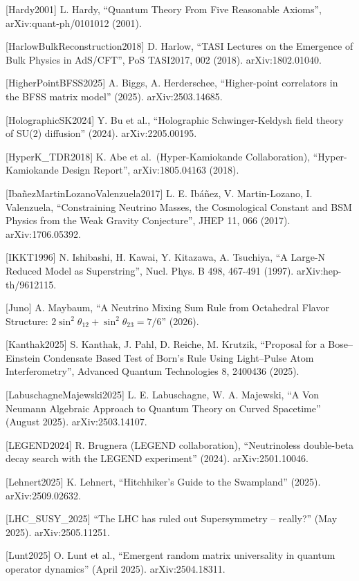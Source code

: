 \documentclass[
]{article}
\begin{document}
{[}Hardy2001{]} L. Hardy, ``Quantum Theory From Five Reasonable
Axioms'', arXiv:quant-ph/0101012 (2001).

{[}HarlowBulkReconstruction2018{]} D. Harlow, ``TASI Lectures on the
Emergence of Bulk Physics in AdS/CFT'', PoS TASI2017, 002 (2018).
arXiv:1802.01040.

{[}HigherPointBFSS2025{]} A. Biggs, A. Herderschee, ``Higher-point
correlators in the BFSS matrix model'' (2025). arXiv:2503.14685.

{[}HolographicSK2024{]} Y. Bu et al., ``Holographic Schwinger-Keldysh
field theory of SU(2) diffusion'' (2024). arXiv:2205.00195.

{[}HyperK\_TDR2018{]} K. Abe et al.~(Hyper-Kamiokande Collaboration),
``Hyper-Kamiokande Design Report'', arXiv:1805.04163 (2018).

{[}IbañezMartinLozanoValenzuela2017{]} L. E. Ibáñez, V. Martin-Lozano,
I. Valenzuela, ``Constraining Neutrino Masses, the Cosmological Constant
and BSM Physics from the Weak Gravity Conjecture'', JHEP 11, 066 (2017).
arXiv:1706.05392.

{[}IKKT1996{]} N. Ishibashi, H. Kawai, Y. Kitazawa, A. Tsuchiya, ``A
Large-N Reduced Model as Superstring'', Nucl. Phys. B 498, 467-491
(1997). arXiv:hep-th/9612115.

{[}Juno{]} A. Maybaum, ``A Neutrino Mixing Sum Rule from Octahedral
Flavor Structure: \(2\sin^2\theta_{12} + \sin^2\theta_{23} = 7/6\)''
(2026).

{[}Kanthak2025{]} S. Kanthak, J. Pahl, D. Reiche, M. Krutzik, ``Proposal
for a Bose--Einstein Condensate Based Test of Born's Rule Using
Light--Pulse Atom Interferometry'', Advanced Quantum Technologies 8,
2400436 (2025).

{[}LabuschagneMajewski2025{]} L. E. Labuschagne, W. A. Majewski, ``A Von
Neumann Algebraic Approach to Quantum Theory on Curved Spacetime''
(August 2025). arXiv:2503.14107.

{[}LEGEND2024{]} R. Brugnera (LEGEND collaboration), ``Neutrinoless
double-beta decay search with the LEGEND experiment'' (2024).
arXiv:2501.10046.

{[}Lehnert2025{]} K. Lehnert, ``Hitchhiker's Guide to the Swampland''
(2025). arXiv:2509.02632.

{[}LHC\_SUSY\_2025{]} ``The LHC has ruled out Supersymmetry -- really?''
(May 2025). arXiv:2505.11251.

{[}Lunt2025{]} O. Lunt et al., ``Emergent random matrix universality in
quantum operator dynamics'' (April 2025). arXiv:2504.18311.
\end{document}
